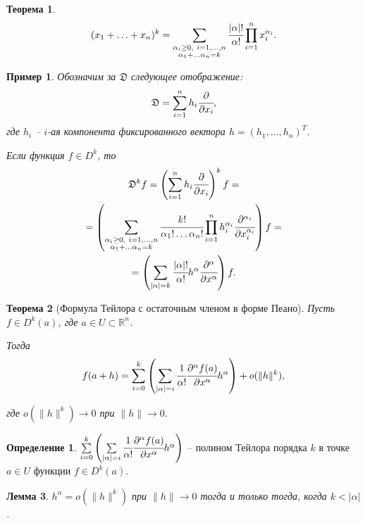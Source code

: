 \documentclass[oneside, final]{book}
\newcommand{\mbb}[1]{\mathbb{#1}}
\newcommand{\mfrk}[1]{\mathfrak{#1}}
\theoremstyle{plain}
\newtheorem{theorem}{Теорема}[chapter]
\newtheorem{lemma}[theorem]{Лемма}
\newtheorem{example}{Пример}[chapter]
\theoremstyle{definition}
\newtheorem{mdef}{Определение}[chapter]
\begin{document}
	\begin{theorem}
		$$
			(x_1 + \ldots + x_n)^k = \sum \limits_{\substack{\alpha_i \ge 0,\ i=1,\ldots,n \\ \alpha_1+\dots\alpha_n=k}} \cfrac {|\alpha|!}{\alpha!} \prod\limits_{i=1}^n x_i^{\alpha_i}.
		$$
	\end{theorem}

	\begin{example}
		Обозначим за $\mfrk D$ следующее отображение:
		$$
			\mfrk D = \sum\limits_{i=1}^n h_i \cfrac {\partial} {\partial x_i},
		$$
		где $h_i$ -- $i$-ая компонента фиксированного вектора $h = (h_1, \ldots, h_n)^T$.
		
		Если функция $f \in D^k$, то 
		\begin{multline*}
			\mfrk{D}^k f = \left( \sum\limits_{i=1}^n h_i \cfrac{\partial} {\partial x_i} \right)^k f =\\
			= \left( \sum\limits_{\substack{\alpha_i \ge 0,\ i=1,\ldots,n \\ \alpha_1+\dots\alpha_n=k}} \cfrac {k!}{\alpha_1!\dots \alpha_n!} \prod\limits_{i=1}^n h_i^{\alpha_i}\cfrac {\partial^{\alpha_i}}{\partial x_i^{\alpha_i}} \right)f =\\
			= \left(\sum\limits_{|\alpha|=k} \cfrac{|\alpha|!}{\alpha!} h^{\alpha} \cfrac {\partial^{\alpha}}{\partial x^{\alpha}}\right) f.
		\end{multline*}
	\end{example}

	\begin{theorem}[Формула Тейлора с остаточным членом в форме Пеано]
		Пусть $f\in D^k(a)$, где $a\in U \subset \mbb R^n$.
		
		Тогда
		$$
			f(a+h) = \sum\limits_{i=0}^k \left( \sum\limits_{|\alpha|=i} \cfrac {1}{\alpha!}  \cfrac {\partial^\alpha f(a)}{\partial x^\alpha} h^\alpha\right) + o(\|h\|^k),
		$$
		
		где $o(\|h\|^k) \to 0$ при $\|h\|\to 0$.
	\end{theorem}

	\begin{mdef}
		$
		\sum\limits_{i=0}^k \left( \sum\limits_{|\alpha|=i} \cfrac {1}{\alpha!}  \cfrac {\partial^\alpha f(a)}{\partial x^\alpha} h^\alpha\right)
		$ -- полином Тейлора порядка $k$ в точке $a\in U$ функции $f\in D^k(a)$.
	\end{mdef}

	\begin{lemma}
		$h^\alpha = o(\|h\|^k)$ при $\|h\|\to0$ тогда и только тогда, когда $k < |\alpha|$.
	\end{lemma}
\end{document}
